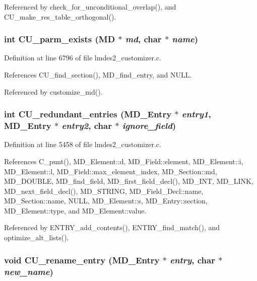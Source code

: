 Referenced by check\_\-for\_\-unconditional\_\-overlap(), and CU\_\-make\_\-res\_\-table\_\-orthogonal().
\subsubsection{\setlength{\rightskip}{0pt plus 5cm}int CU\_\-parm\_\-exists (\bf{MD} $\ast$ {\em md}, char $\ast$ {\em name})}\label{lmdes2__customizer_8c_77b3447d0de2a17ecaa97e21cad307d5}




Definition at line 6796 of file lmdes2\_\-customizer.c.

References CU\_\-find\_\-section(), MD\_\-find\_\-entry, and NULL.

Referenced by customize\_\-md().
\subsubsection{\setlength{\rightskip}{0pt plus 5cm}int CU\_\-redundant\_\-entries (\bf{MD\_\-Entry} $\ast$ {\em entry1}, \bf{MD\_\-Entry} $\ast$ {\em entry2}, char $\ast$ {\em ignore\_\-field})}\label{lmdes2__customizer_8c_33651693828cf0dceddf0652bb22eac0}




Definition at line 5458 of file lmdes2\_\-customizer.c.

References C\_\-punt(), MD\_\-Element::d, MD\_\-Field::element, MD\_\-Element::i, MD\_\-Element::l, MD\_\-Field::max\_\-element\_\-index, MD\_\-Section::md, MD\_\-DOUBLE, MD\_\-find\_\-field, MD\_\-first\_\-field\_\-decl(), MD\_\-INT, MD\_\-LINK, MD\_\-next\_\-field\_\-decl(), MD\_\-STRING, MD\_\-Field\_\-Decl::name, MD\_\-Section::name, NULL, MD\_\-Element::s, MD\_\-Entry::section, MD\_\-Element::type, and MD\_\-Element::value.

Referenced by ENTRY\_\-add\_\-contents(), ENTRY\_\-find\_\-match(), and optimize\_\-alt\_\-lists().
\subsubsection{\setlength{\rightskip}{0pt plus 5cm}void CU\_\-rename\_\-entry (\bf{MD\_\-Entry} $\ast$ {\em entry}, char $\ast$ {\em new\_\-name})}\label{lmdes2__customizer_8c_1a485003e9cc947cf64e3769e68af28e}




